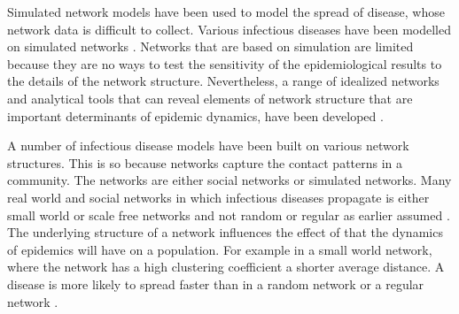 Simulated network models have been used to model the spread of disease, whose network data is difficult to collect. Various infectious diseases have been modelled on simulated networks \citep{keeling2005networks}. Networks that are based on simulation are limited because they are no ways to test the sensitivity of the epidemiological results to the details of the network structure. Nevertheless, a range of idealized networks and analytical tools that can reveal elements of network structure that are important determinants of epidemic dynamics, have been developed \citep{keeling2005networks}. 

A number of infectious disease models have been built on various network structures. This is so because networks capture the contact patterns in a community. The networks are either social networks or simulated networks. Many real world and social networks in which infectious diseases propagate is either small world or scale free networks and not random or regular as earlier assumed \cite{watts1998collective}. The underlying structure of a network influences  the effect of that the dynamics of epidemics will have on a population. For example in a small world network, where the network has a high clustering coefficient a shorter average distance. A disease is more likely to spread faster than in a random network or a regular network \citep{watts1998collective}.



